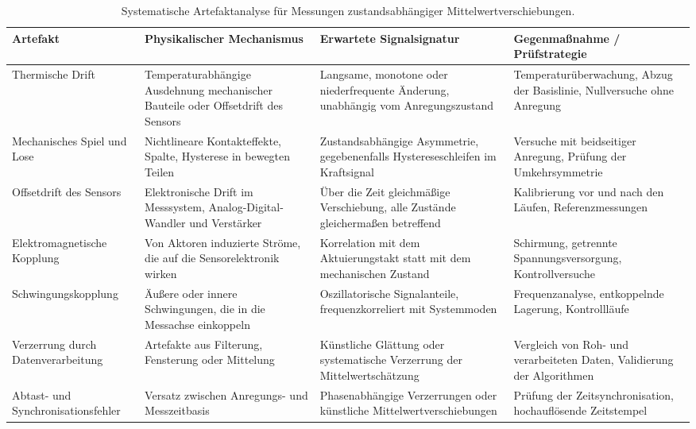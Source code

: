 \documentclass[12pt,a4paper]{report}
\begin{document}
\begin{table}[htbp]
\centering
\caption{Systematische Artefaktanalyse für Messungen
zustandsabhängiger Mittelwertverschiebungen.}
\small
\begin{tabular}{@{}>{\raggedright\arraybackslash}p{2.6cm} >{\raggedright\arraybackslash}p{3.8cm} >{\raggedright\arraybackslash}p{3.8cm} >{\raggedright\arraybackslash}p{4.5cm}@{}}
\toprule
Artefakt & Physikalischer Mechanismus & Erwartete Signalsignatur & Gegenmaßnahme / Prüfstrategie \\
\midrule

Thermische Drift
& Temperaturabhängige Ausdehnung mechanischer Bauteile oder Offsetdrift des Sensors
& Langsame, monotone oder niederfrequente Änderung, unabhängig vom Anregungszustand
& Temperaturüberwachung, Abzug der Basislinie, Nullversuche ohne Anregung \\

Mechanisches Spiel und Lose
& Nichtlineare Kontakteffekte, Spalte, Hysterese in bewegten Teilen
& Zustandsabhängige Asymmetrie, gegebenenfalls Hystereseschleifen im Kraftsignal
& Versuche mit beidseitiger Anregung, Prüfung der Umkehrsymmetrie \\

Offsetdrift des Sensors
& Elektronische Drift im Messsystem, Analog-Digital-Wandler und Verstärker
& Über die Zeit gleichmäßige Verschiebung, alle Zustände gleichermaßen betreffend
& Kalibrierung vor und nach den Läufen, Referenzmessungen \\

Elektro\-magnetische Kopplung
& Von Aktoren induzierte Ströme, die auf die Sensorelektronik wirken
& Korrelation mit dem Aktuierungstakt statt mit dem mechanischen Zustand
& Schirmung, getrennte Spannungsversorgung, Kontrollversuche \\

Schwingungs\-kopplung
& Äußere oder innere Schwingungen, die in die Messachse einkoppeln
& Oszillatorische Signalanteile, frequenzkorreliert mit Systemmoden
& Frequenzanalyse, entkoppelnde Lagerung, Kontrollläufe \\

Verzerrung durch Datenverarbeitung
& Artefakte aus Filterung, Fensterung oder Mittelung
& Künstliche Glättung oder systematische Verzerrung der Mittelwertschätzung
& Vergleich von Roh- und verarbeiteten Daten, Validierung der Algorithmen \\

Abtast- und Synchronisationsfehler
& Versatz zwischen Anregungs- und Messzeitbasis
& Phasenabhängige Verzerrungen oder künstliche Mittelwertverschiebungen
& Prüfung der Zeitsynchronisation, hochauflösende Zeitstempel \\

\bottomrule
\end{tabular}
\end{table}
\end{document}
